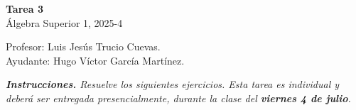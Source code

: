 \documentclass[letterpaper,DIV=14,headsepline,12pt]{scrartcl}
\begin{document}

    \begin{center}
        {\fontsize{30}{60}\rmfamily \textbf{Tarea 3}} \\ \vspace{.2cm}
        Álgebra Superior 1, 2025-4
        
    \end{center}
    \begin{flushright}
        \footnotesize \hfill Profesor: Luis Jesús Trucio Cuevas.\\
        \hfill Ayudante: Hugo Víctor García Martínez.
    \end{flushright}
    
    \noindent\textit{\textbf{Instrucciones.} Resuelve los siguientes ejercicios. Esta tarea es individual y deberá ser entregada presencialmente, durante la clase del \textbf{viernes 4 de julio}.}\vspace{.4cm}
\end{document}
